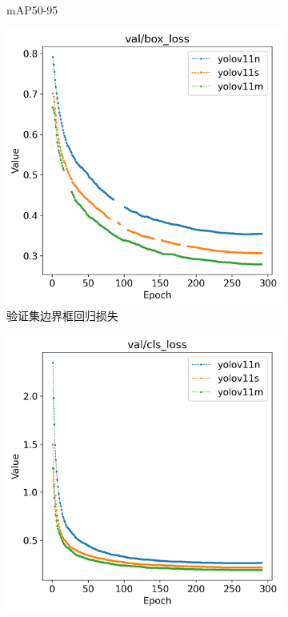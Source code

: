 \begin{figure}[H]
\begin{subfigure}[t]{0.43\textwidth}
        \caption{mAP50-95}
        \label{fig:track_metrics_mAP50-95}
    \end{subfigure}
    \begin{subfigure}[t]{0.43\textwidth}
        \centering
        \includegraphics[width=\textwidth]{figs/chap04/track_result/track_val_box_loss.png}
        \caption{验证集边界框回归损失}
        \label{fig:track_val_box_loss}
    \end{subfigure}
    \begin{subfigure}[t]{0.43\textwidth}
        \centering
        \includegraphics[width=\textwidth]{figs/chap04/track_result/track_val_cls_loss.png}

\end{subfigure}
\end{figure}
